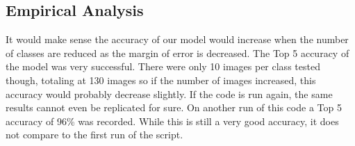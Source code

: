 \subsection*{Empirical Analysis}
It would make sense the accuracy of our model would increase when the number of classes are reduced as the margin of error is decreased.
The Top 5 accuracy of the model was very successful.
There were only 10 images per class tested though, totaling at 130 images so if the number of images increased, this accuracy would probably decrease slightly.
If the code is run again, the same results cannot even be replicated for sure.
On another run of this code a Top 5 accuracy of 96\% was recorded.
While this is still a very good accuracy, it does not compare to the first run of the script.